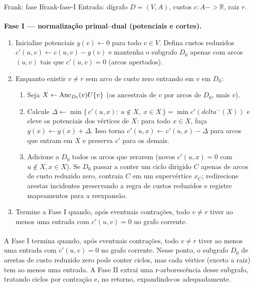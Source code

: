 \documentclass[12pt,a4paper]{article}
\def\emph#1{#1}%
\def\cup{\string U}%
\def\to{->}%
\def\delta{delta}%
\begin{document}
\begin{algobox}{Frank: fase I}{frank-fase-I}
Entrada: dígrafo \(D=(V,A)\), custos \(c:A\to\mathbb{R}\), raiz \(r\).
\paragraph{}
 \textbf{Fase I — normalização primal–dual (potenciais e cortes).}
    \begin{enumerate}\setlength{\itemsep}{1pt}
        \item Inicialize potenciais \(y(v)\gets 0\) para todo \(v\in V\). Defina custos reduzidos \(c'(u,v)\gets c(u,v)-y(v)\) e mantenha o subgrafo \(D_0\) apenas com arcos \((u,v)\) tais que \(c'(u,v)=0\) (arcos \emph{apertados}).
        \item Enquanto existir \(v\neq r\) sem arco de custo zero \emph{entrando} em \(v\) em \(D_0\):
        \begin{enumerate}\setlength{\itemsep}{1pt}
            \item Seja \(X\gets \mathrm{Anc}_{D_0}(v)\cup\{v\}\) (os ancestrais de \(v\) por arcos de \(D_0\), mais \(v\)).
            \item Calcule \(\Delta\gets\min\{\,c'(u,x):\ u\notin X,\ x\in X\,\}=\min c'(\delta^-(X))\) e \emph{eleve} os potenciais dos vértices de \(X\): para todo \(x\in X\), faça \(y(x)\gets y(x)+\Delta\). Isso torna \(c'(u,x)\gets c'(u,x)-\Delta\) para arcos que entram em \(X\) e preserva \(c'\) para os demais.
            \item Adicione a \(D_0\) todos os arcos que zerarem (novos \(c'(u,x)=0\) com \(u\notin X, x\in X\)). Se \(D_0\) passar a conter um ciclo dirigido \(C\) apenas de arcos de custo reduzido zero, contraia \(C\) em um supervértice \(x_C\); redirecione arestas incidentes preservando a regra de custos reduzidos e registre mapeamentos para a reexpansão.
        \end{enumerate}
        \item Termine a Fase I quando, após eventuais contrações, todo \(v\neq r\) tiver ao menos uma entrada com \(c'(u,v)=0\) no grafo corrente.
    \end{enumerate}
\end{algobox}

\paragraph{}
A Fase I termina quando, após eventuais contrações, todo \(v\neq r\) tiver ao menos uma entrada com \(c'(u,v)=0\) no grafo corrente. Nesse ponto, o subgrafo \(D_0\) de arestas de custo reduzido zero pode conter ciclos, mas cada vértice (exceto a raiz) tem ao menos uma entrada. A Fase II extrai uma r-arborescência desse subgrafo, tratando ciclos por contração e, no retorno, expandindo-os adequadamente.
\end{document}
